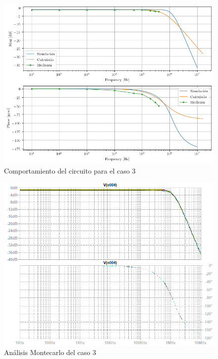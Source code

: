 \begin{figure}[H]
\begin{centering}
\includegraphics[scale=0.5]{../Ex1/iB/Resources1b/H3b}
\par\end{centering}
\caption{Comportamiento del circuito para el caso 3}
\end{figure}

\begin{figure}[H]
\begin{centering}
\includegraphics[scale=0.5]{../Ex1/iB/Resources1b/Montecarlo3}
\par\end{centering}
\caption{Análisis Montecarlo del caso 3}
\end{figure}


